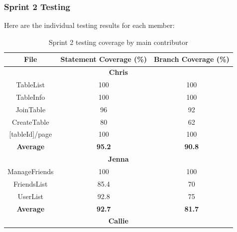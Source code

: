 \subsubsection{Sprint 2 Testing}

Here are the individual testing results for each member:

\pagebreak

\begin{table}[!hbt]
\centering 
\caption{Sprint 2 testing coverage by main contributor}
\label{tab: sprint 2 testing}
\begin{tabular}{|ccc|}
\hline
\multicolumn{1}{|c|}{\textbf{File}} & \multicolumn{1}{c|}{\textbf{Statement Coverage (\%)}} & \textbf{Branch Coverage (\%)} \\ \hline
\multicolumn{3}{|c|}{\textbf{Chris}}                                                          \\ \hline
\multicolumn{1}{|c|}{TableList}          & \multicolumn{1}{c|}{100}           & 100           \\ \hline
\multicolumn{1}{|c|}{TableInfo}          & \multicolumn{1}{c|}{100}           & 100           \\ \hline
\multicolumn{1}{|c|}{JoinTable}          & \multicolumn{1}{c|}{96}            & 92            \\ \hline
\multicolumn{1}{|c|}{CreateTable}        & \multicolumn{1}{c|}{80}            & 62            \\ \hline
\multicolumn{1}{|c|}{{[}tableId{]}/page} & \multicolumn{1}{c|}{100}           & 100           \\ \hline
\multicolumn{1}{|c|}{\textbf{Average}}   & \multicolumn{1}{c|}{\textbf{95.2}} & \textbf{90.8} \\ \hline
\multicolumn{3}{|c|}{\textbf{Jenna}}                                                          \\ \hline
\multicolumn{1}{|c|}{ManageFriends}      & \multicolumn{1}{c|}{100}           & 100           \\ \hline
\multicolumn{1}{|c|}{FriendsList}        & \multicolumn{1}{c|}{85.4}          & 70            \\ \hline
\multicolumn{1}{|c|}{UserList}           & \multicolumn{1}{c|}{92.8}          & 75            \\ \hline
\multicolumn{1}{|c|}{\textbf{Average}}   & \multicolumn{1}{c|}{\textbf{92.7}} & \textbf{81.7} \\ \hline
\multicolumn{3}{|c|}{\textbf{Callie}}                                                         \\ \hline

\end{tabular}
\end{table}
